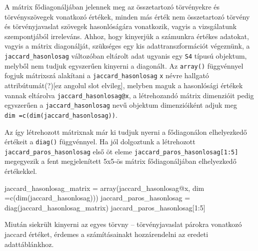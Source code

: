 \documentclass[
]{book}
\newenvironment{Shaded}{\begin{snugshade}}{\end{snugshade}}
\newcommand{\AttributeTok}[1]{\textcolor[rgb]{0.77,0.63,0.00}{#1}}
\newcommand{\DecValTok}[1]{\textcolor[rgb]{0.00,0.00,0.81}{#1}}
\newcommand{\FunctionTok}[1]{\textcolor[rgb]{0.00,0.00,0.00}{#1}}
\newcommand{\NormalTok}[1]{#1}
\newcommand{\OtherTok}[1]{\textcolor[rgb]{0.56,0.35,0.01}{#1}}
\newcommand{\SpecialCharTok}[1]{\textcolor[rgb]{0.00,0.00,0.00}{#1}}
\begin{document}
A mátrix fődiagonáljában jelennek meg az összetartozó törvényekre és
törvényszövegek vonatkozó értékek, minden más érték nem összetartozó
törvény és törvényjavaslat szövegek hasonlóságára vonatkozik, vagyis a
vizsgálatunk szempontjából irreleváns. Ahhoz, hogy kinyerjük a számunkra
értékes adatokat, vagyis a mátrix diagonálját, szükséges egy kis
adattranszformációt végeznünk, a \texttt{jaccard\_hasonlosag} változóban
eltárolt adat ugyanis egy \texttt{S4} típusú objektum, melyből nem
tudjuk egyszerűen kinyerni a diagonált. Az \texttt{array()} függvénnyel
fogjuk mátrixszá alakítani a \texttt{jaccard\_hasonlosag} \texttt{x}
névre hallgató attribútumát(?){[}ez angolul slot elvileg{]}, melyben
maguk a hasonlósági értékek vannak eltárolva
\texttt{jaccard\_hasonlosag@x}, a létrehozandó mátrix dimenzióit pedig
egyszerűen a \texttt{jaccard\_hasonlosag} nevű objektum dimenzióiként
adjuk meg \texttt{dim\ =c(dim(jaccard\_hasonlosag))}.

Az így létrehozott mátrixnak már ki tudjuk nyerni a fődiagonálon
elhelyezkedő értékeit a \texttt{diag()} függvénnyel. Ha jól dolgoztunk a
létrehozott \texttt{jaccard\_paros\_hasonlosag} első öt eleme
\texttt{jaccard\_paros\_hasonlosag{[}1:5{]}} megegyezik a fent
megjelenített 5x5-ös mátrix fődiagonáljában elhelyezkedő értékekkel.

\begin{Shaded}
\begin{Highlighting}[]
\NormalTok{jaccard\_hasonlosag\_matrix }\OtherTok{=} \FunctionTok{array}\NormalTok{(jaccard\_hasonlosag}\SpecialCharTok{@}\NormalTok{x, }\AttributeTok{dim =}\FunctionTok{c}\NormalTok{(}\FunctionTok{dim}\NormalTok{(jaccard\_hasonlosag)))}
\NormalTok{jaccard\_paros\_hasonlosag }\OtherTok{=} \FunctionTok{diag}\NormalTok{(jaccard\_hasonlosag\_matrix)}
\NormalTok{jaccard\_paros\_hasonlosag[}\DecValTok{1}\SpecialCharTok{:}\DecValTok{5}\NormalTok{]}
\end{Highlighting}
\end{Shaded}

Miután siekrült kinyerni az egyes törvny -- törvényjavaslat párokra
vonatkozó jaccard értéket, érdemes a számításainakt hozzárendelni az
eredeti adattáblánkhoz.

\begin{Shaded}
\end{Shaded}
\end{document}
